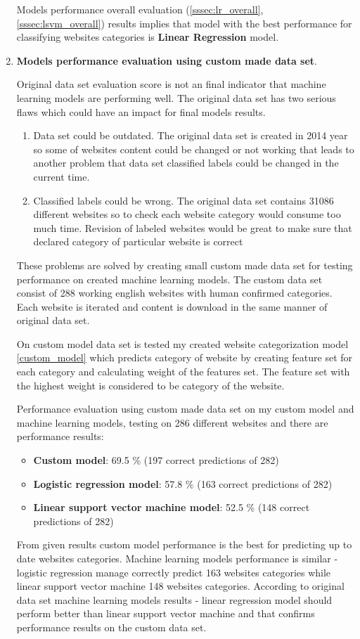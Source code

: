 \begin{enumerate}
    
    Models performance overall evaluation (\ref{sssec:lr_overall}, \ref{sssec:lsvm_overall}) results  implies that model with the best performance for classifying websites categories is \textbf{Linear Regression} model. 
    
\item \textbf{Models performance evaluation using custom made data set}.

Original data set evaluation score is not an final indicator that machine learning models are performing well. The original data set has two serious flaws which could have an impact for final models results. 
\begin{enumerate}
    \item Data set could be outdated. The original data set is created in 2014 year so some of websites content could be changed or not working that leads to another problem that data set classified labels could be changed in the current time.
    \item Classified labels could be wrong. The original data set contains 31086 different websites so to check each website category would consume too much time. Revision of labeled websites would be great to make sure that declared category of particular website is correct
\end{enumerate}

These problems are solved by creating small custom made data set for testing performance on created machine learning models. The custom data set consist of 288 working english websites with human confirmed categories. Each website is iterated and content is download in the same manner of original data set.

On custom model data set is tested my created website categorization model \ref{custom_model} which predicts category of website by creating feature set for each category and calculating weight of the features set. The feature set with the highest weight is considered to be category of the website.

Performance evaluation using custom made data set on my custom model and machine learning models, testing on 286 different websites and there are performance results:

\begin{itemize}
    \item \textbf{Custom model}: 69.5 \% (197 correct predictions of 282)
    \item \textbf{Logistic regression model}: 57.8 \% (163 correct predictions of 282)
    \item \textbf{Linear support vector machine model}: 52.5 \% (148 correct predictions of 282)
\end{itemize}
From given results custom model performance is the best for predicting up to date websites categories. Machine learning models performance is similar - logistic regression manage correctly predict 163 websites categories while linear support vector machine 148 websites categories. According to original data set machine learning models results - linear regression model should perform better than linear support vector machine and that confirms performance results on the custom data set.


\end{enumerate}
